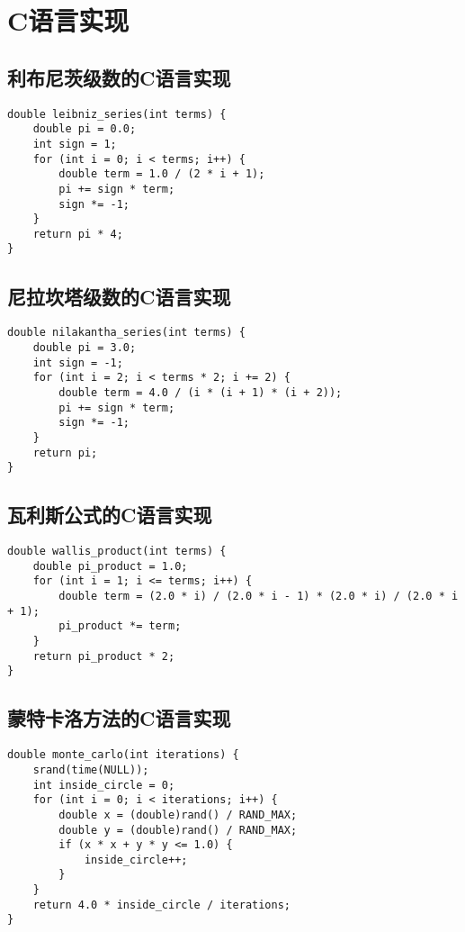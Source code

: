 \documentclass{ctexart}
\begin{document}
\section{C语言实现}
\subsection{利布尼茨级数的C语言实现}
\begin{lstlisting}
double leibniz_series(int terms) {
    double pi = 0.0;
    int sign = 1;
    for (int i = 0; i < terms; i++) {
        double term = 1.0 / (2 * i + 1);
        pi += sign * term;
        sign *= -1;
    }
    return pi * 4;
}
\end{lstlisting}

\subsection{尼拉坎塔级数的C语言实现}
\begin{lstlisting}
double nilakantha_series(int terms) {
    double pi = 3.0;
    int sign = -1;
    for (int i = 2; i < terms * 2; i += 2) {
        double term = 4.0 / (i * (i + 1) * (i + 2));
        pi += sign * term;
        sign *= -1;
    }
    return pi;
}
\end{lstlisting}

\subsection{瓦利斯公式的C语言实现}
\begin{lstlisting}
double wallis_product(int terms) {
    double pi_product = 1.0;
    for (int i = 1; i <= terms; i++) {
        double term = (2.0 * i) / (2.0 * i - 1) * (2.0 * i) / (2.0 * i + 1);
        pi_product *= term;
    }
    return pi_product * 2;
}
\end{lstlisting}

\subsection{蒙特卡洛方法的C语言实现}
\begin{lstlisting}
double monte_carlo(int iterations) {
    srand(time(NULL));
    int inside_circle = 0;
    for (int i = 0; i < iterations; i++) {
        double x = (double)rand() / RAND_MAX;
        double y = (double)rand() / RAND_MAX;
        if (x * x + y * y <= 1.0) {
            inside_circle++;
        }
    }
    return 4.0 * inside_circle / iterations;
}
\end{lstlisting}
\end{document}
